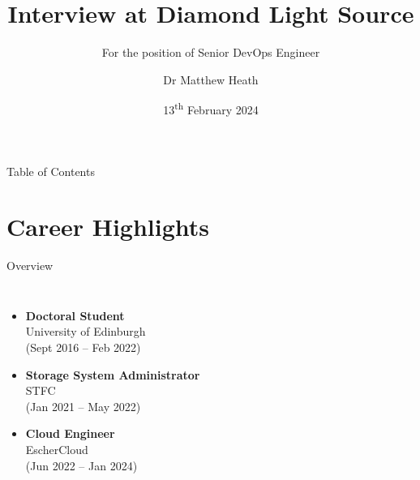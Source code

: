 \documentclass[10pt]{beamer}
\title{Interview at Diamond Light Source}
\date{13\textsuperscript{th} February 2024}
\author{Dr Matthew Heath}
\subtitle{For the position of Senior DevOps Engineer}
\begin{document}
  \maketitle
  \begin{frame}{Table of Contents}
    \tableofcontents
  \end{frame}

  \section{Career Highlights}
  \begin{frame}{Overview}
    \begin{columns}
        \begin{itemize}
          \item \textbf{Doctoral Student}
          \\\alert{University of Edinburgh}
          \\(Sept 2016 -- Feb 2022)
          \item \textbf{Storage System Administrator}
          \\\alert{STFC}
          \\(Jan 2021 -- May 2022)
          \item \textbf{Cloud Engineer}
          \\\alert{EscherCloud}
          \\ (Jun 2022 -- Jan 2024)
        \end{itemize}


\end{columns}
\end{frame}
\end{document}
